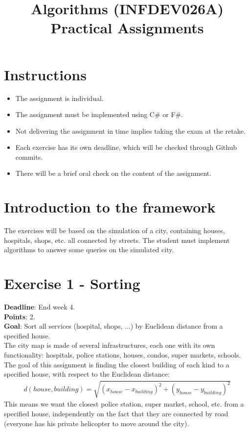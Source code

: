 \documentclass[10pt,a4paper]{article}
\title{Algorithms (INFDEV026A) \\ Practical Assignments}
\author { }
\date { }
\begin{document}
\maketitle

\section*{Instructions}
\begin{itemize}[noitemsep]
\item The assignment is individual.
\item The assignment must be implemented using C\# or F\#.
\item Not delivering the assignment in time implies taking the exam at the retake.
\item Each exercise has its own deadline, which will be checked through Github commits.
\item There will be a brief oral check on the content of the assignment.
\end{itemize}

\section*{Introduction to the framework}
The exercises will be based on the simulation of a city, containing houses, hospitals, shops, etc. all connected by streets. The student must implement algorithms to answer some queries on the simulated city.

\section*{Exercise 1 - Sorting}

\textbf{Deadline}: End week 4. \\
\textbf{Points}: 2. \\
\textbf{Goal}: Sort all services (hospital, shops, ...) by Euclidean distance from a specified house.\\

The city map is made of several infrastructures, each one with its own functionality: hospitals, police stations, houses, condos, super markets, schools. The goal of this assignment is finding the closest building of each kind to a specified house, with respect to the Euclidean distance:
\begin{align*}
d(house,building) = \sqrt{(x_{house} - x_{building})^{2} + (y_{house} - y_{building})^{2} } 
\end{align*}
\noindent
This means we want the closest police station, super market, school, etc. from a specified house, independently on the fact that they are connected by road (everyone has his private helicopter to move around the city).
\end{document}
